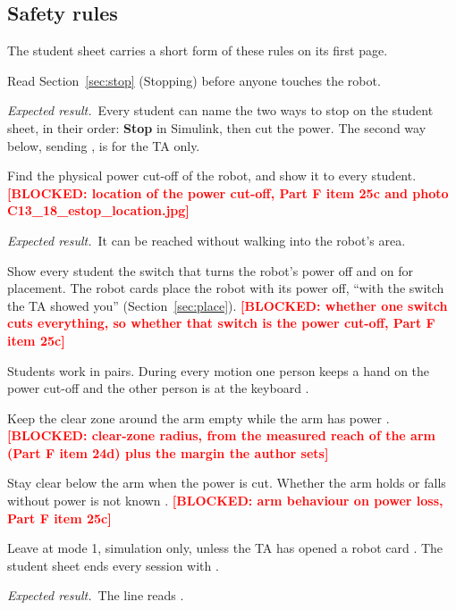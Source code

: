 \documentclass[11pt]{article}
\newcommand{\todo}[1]{\textcolor{red}{\textbf{[#1]}}}
\newcommand{\cmd}[1]{\texttt{\romecode{#1}}}
\newif\ifshowsrc
\newcommand{\src}[1]{\ifshowsrc{\scriptsize\,[\texttt{\romecode{#1}}]}\fi}
\newcommand{\expect}{\par\textit{Expected result.}\ }
\begin{document}
\subsection*{Safety rules}
The student sheet carries a short form of these rules on its first page.
\begin{steps}
  \item Read Section~\ref{sec:stop} (Stopping) before anyone touches the robot.
  \expect Every student can name the two ways to stop on the student sheet, in their order: \textbf{Stop} in
  Simulink, then cut the power. The second way below, sending \cmd{STOP_ALL}, is for the TA only.
  \item Find the physical power cut-off of the robot, and show it to every student.
  \todo{BLOCKED: location of the power cut-off, Part F item 25c and photo C13\_18\_estop\_location.jpg}
  \expect It can be reached without walking into the robot's area.
  \item Show every student the switch that turns the robot's power off and on for placement. The robot cards place the
  robot with its power off, ``with the switch the TA showed you'' (Section~\ref{sec:place}).
  \todo{BLOCKED: whether one switch cuts everything, so whether that switch is the power cut-off, Part F item 25c}
  \item Students work in pairs. During every motion one person keeps a hand on the power cut-off and the
  other person is at the keyboard \src{docs/lab/PART_F_BENCH_CHECKLIST.md:18}.
  \item Keep the clear zone around the arm empty while the arm has power
  \src{docs/lab/PART_F_BENCH_CHECKLIST.md:20}.
  \todo{BLOCKED: clear-zone radius, from the measured reach of the arm (Part F item 24d) plus the margin the author sets}
  \item Stay clear below the arm when the power is cut. Whether the arm holds or falls without
  power is not known \src{docs/lab/PART_F_BENCH_CHECKLIST.md:21}.
  \todo{BLOCKED: arm behaviour on power loss, Part F item 25c}
  \item Leave \cmd{run_mode} at mode 1, simulation only, unless the TA has opened a robot card
  \src{run_mode_table.m:30}. The student sheet ends every session with \cmd{rome_mode(1);}.
  \expect The line reads \cmd{run_mode = 1;} \src{define_constants.m:9}.
\end{steps}
\end{document}
